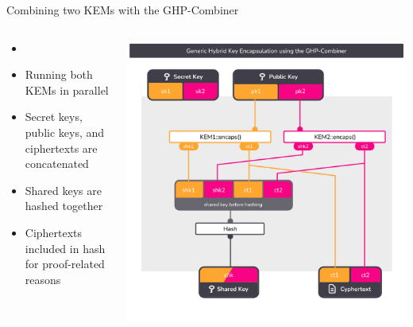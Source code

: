 \begin{frame}{Combining two KEMs with the GHP-Combiner}
  \begin{columns}[c]
    \begin{column}{.4\linewidth}
      \small
      \begin{itemize}
        \item {} \citeGhp
        \item Running both KEMs in parallel
        \item Secret keys, public keys, and ciphertexts are concatenated
        \item Shared keys are hashed together
        \item Ciphertexts included in hash for proof-related reasons
      \end{itemize}
    \end{column}

    \begin{column}{.6\linewidth}
      \includegraphics[height=.92\textheight,page=1,clip=true,trim={0.5cm 1cm 0.7cm 1.5cm}]{graphics/rosenpass-encapsulation-combiner.pdf}
    \end{column}

  \end{columns}
\end{frame}

